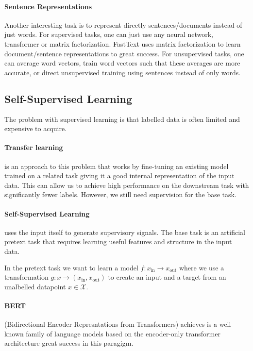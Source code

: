 \documentclass{article}
\begin{document}
\paragraph{Sentence Representations}

Another interesting task is to represent directly sentences/documents instead of just words.
For supervised tasks, one can just use any neural network, transformer or matrix factorization.
FastText uses matrix factorization to learn document/sentence representations to great success.
For unsupervised tasks, one can average word vectors, train word vectors such that these averages are more accurate, or direct unsupervised training using sentences instead of only words.

\subsection{Self-Supervised Learning}

The problem with supervised learning is that labelled data is often limited and expensive to acquire.

\paragraph{Transfer learning} is an approach to this problem that works by fine-tuning an existing model trained on a related task giving it a good internal representation of the input data.
This can allow us to achieve high performance on the downstream task with significantly fewer labels.
However, we still need supervision for the base task.

\paragraph{Self-Supervised Learning} uses the input itself to generate supervisory signals.
The base task is an artificial pretext task that requires learning useful features and structure in the input data.

In the pretext task we want to learn a model $f: x_\text{in} \to x_\text{out}$ where we use a transformation $g : x \to (x_\text{in}, x_\text{out})$ to create an input and a target from an unalbelled datapoint $x \in \mathcal{X}$.

\paragraph{BERT} (Bidirectional Encoder Represntations from Transformers) achieves is a well known family of language models based on the encoder-only transformer architecture great success in this paragigm.
\end{document}
